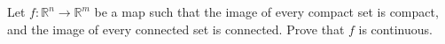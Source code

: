 Let $f\colon \mathbb{R}^n \rightarrow \mathbb{R}^m$ be a map such that the image of every compact set is compact, and the image of every connected set is connected. Prove that $f$ is continuous.